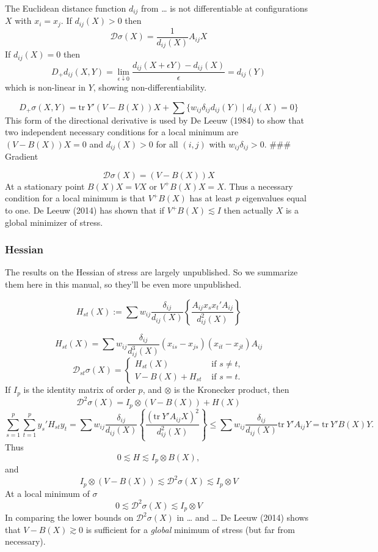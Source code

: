 \documentclass[
  12pt,
]{article}
\begin{document}
The Euclidean distance function \(d_{ij}\) from \ldots{} is not differentiable
at configurations \(X\) with \(x_i=x_j\). If \(d_{ij}(X)>0\) then \[
\mathcal{D}\sigma(X)=\frac{1}{d_{ij}(X)}A_{ij}X
\] If \(d_{ij}(X)=0\) then \[
D_+d_{ij}(X,Y)=\lim_{\epsilon\downarrow 0}\frac{d_{ij}(X+\epsilon Y)-d_{ij}(X)}{\epsilon}=d_{ij}(Y)
\] which is non-linear in \(Y\), showing non-differentiability.

\[
D_+\sigma(X,Y)=\text{tr}\ Y'(V-B(X))X+\sum\{w_{ij}\delta_{ij}d_{ij}(Y)\mid d_{ij}(X)=0\}
\] This form of the directional derivative is used by De Leeuw (1984) to
show that two independent necessary conditions for a local minimum are
\((V-B(X))X=0\) and \(d_{ij}(X)>0\) for all \((i,j)\) with
\(w_{ij}\delta_{ij}>0\). \#\#\# Gradient

\[
\mathcal{D}\sigma(X)=(V-B(X))X
\] At a stationary point \(B(X)X=VX\) or \(V^+B(X)X=X\). Thus a necessary
condition for a local minimum is that \(V^+B(X)\) has at least \(p\)
eigenvalues equal to one. De Leeuw (2014) has shown that if
\(V^+B(X)\lesssim I\) then actually \(X\) is a global minimizer of stress.

\subsubsection{Hessian}\label{hessian}

The results on the Hessian of stress are largely unpublished. So we
summarize them here in this manual, so they'll be even more unpublished.

\[
H_{st}(X):=\sum w_{ij}\frac{\delta_{ij}}{d_{ij}(X)}\left\{\frac{A_{ij}x_sx_t'A_{ij}}{d_{ij}^2(X)}\right\}
\]

\[
H_{st}(X)=\sum   w_{ij}\frac{\delta_{ij}}{d_{ij}^3(X)}(x_{is}-x_{js})(x_{it}-x_{jt})A_{ij}
\] \[
\mathcal{D}_{st}\sigma(X)=\begin{cases}H_{st}(X)&\text{ if }s\not= t,\\
V-B(X)+H_{st}&\text{ if }s= t.
\end{cases}
\] If \(I_p\) is the identity matrix of order \(p\), and \(\otimes\) is the
Kronecker product, then \[
\mathcal{D}^2\sigma(X)=I_p\otimes(V - B(X))+ H(X)
\] \[
\sum_{s=1}^p\sum_{t=1}^p y_s'H_{st}y_t=\sum w_{ij}\frac{\delta_{ij}}{d_{ij}(X)}\left\{\frac{(\text{tr} \ Y'A_{ij}X)^2}{d_{ij}^2(X)}\right\}\leq\sum w_{ij}\frac{\delta_{ij}}{d_{ij}(X)}\text{tr}\ Y'A_{ij}Y=\text{tr}\ Y'B(X)Y.
\] Thus \[
0\lesssim H\lesssim I_p\otimes B(X),
\] and \[
I_p\otimes (V-B(X))\lesssim\mathcal{D}^2\sigma(X)\lesssim I_p\otimes V
\] At a local minimum of \(\sigma\) \[
0\lesssim\mathcal{D}^2\sigma(X)\lesssim I_p\otimes V
\] In comparing the lower bounds on \(\mathcal{D}^2\sigma(X)\) in \ldots{} and
\ldots{} De Leeuw (2014) shows that \(V-B(X)\gtrsim 0\) is sufficient for a
\emph{global} minimum of stress (but far from necessary).
\end{document}
